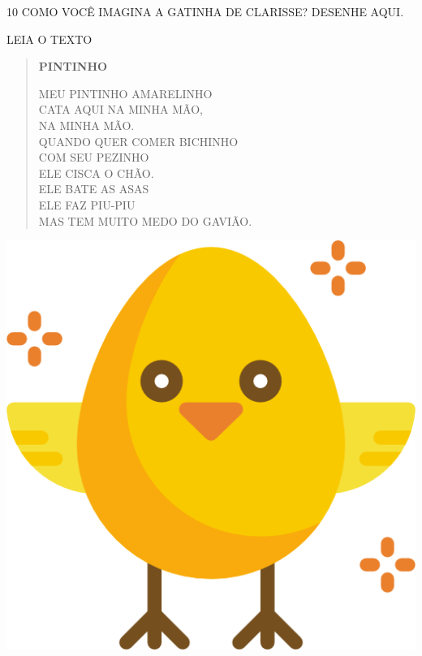 
\num{10} COMO VOCÊ IMAGINA A GATINHA DE CLARISSE? DESENHE AQUI.

\begin{mdframed}[linewidth=2pt,linecolor=salmao,roundcorner=2pt]
\vspace{3cm}
\end{mdframed}

LEIA O TEXTO

\begin{minipage}{.8\textwidth}
\begin{verse}
\textbf{PINTINHO}

MEU PINTINHO AMARELINHO\\
CATA AQUI NA MINHA MÃO,\\
NA MINHA MÃO.\\
QUANDO QUER COMER BICHINHO\\
COM SEU PEZINHO\\
ELE CISCA O CHÃO.\\
ELE BATE AS ASAS\\
ELE FAZ PIU-PIU\\
MAS TEM MUITO MEDO DO GAVIÃO.

\end{verse}
\end{minipage}
\begin{minipage}{.2\textwidth}
\includegraphics[width=\textwidth]{media/image129.png}
\end{minipage}


